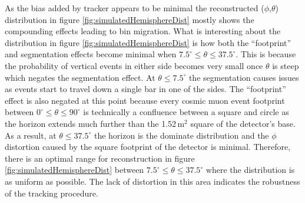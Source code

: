 As the bias added by tracker appears to be minimal the reconstructed ($\phi$,$\theta$) distribution in figure \ref{fig:simulatedHemisphereDist} mostly shows the compounding effects leading to bin migration. What is interesting about the distribution in figure \ref{fig:simulatedHemisphereDist} is how both the ``footprint'' and segmentation effects become minimal when $7.5^\circ \leq \theta \leq 37.5^\circ$. This is because the probability of vertical events in either side becomes very small once $\theta$ is steep which negates the segmentation effect. At $\theta \leq 7.5^\circ$ the segmentation causes issues as events start to travel down a single bar in one of the sides. The ``footprint''  effect is also negated at this point because every cosmic muon event footprint between $0^\circ \leq \theta \leq 90^\circ$ is technically a confluence between a square and circle as the horizon extends much further than the 1.52\,m$^2$ square of the detector's base. As a result, at $\theta \leq 37.5^\circ$  the horizon is the dominate distribution and the $\phi$ distortion caused by the square footprint of the detector is minimal. Therefore, there is an optimal range for reconstruction in figure \ref{fig:simulatedHemisphereDist} between $7.5^\circ \leq \theta \leq 37.5^\circ$ where the distribution is as uniform as possible. The lack of distortion in this area indicates the robustness of the tracking procedure. 

